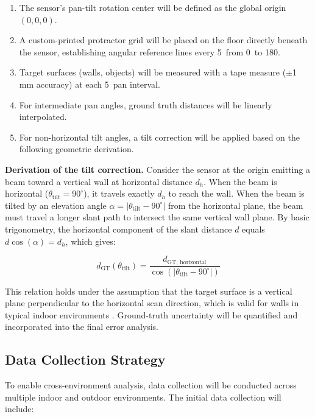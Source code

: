 \documentclass[12pt,a4paper]{article}
\begin{document}
    \begin{enumerate}[leftmargin=0.35in]
        \item The sensor's pan-tilt rotation center will be defined as the global origin $(0, 0, 0)$.
        \item A custom-printed protractor grid will be placed on the floor directly beneath the sensor, establishing angular reference lines every 5\textdegree~from 0\textdegree~to 180\textdegree.
        \item Target surfaces (walls, objects) will be measured with a tape measure ($\pm$1\,mm accuracy) at each 5\textdegree~pan interval.
        \item For intermediate pan angles, ground truth distances will be linearly interpolated.
        \item For non-horizontal tilt angles, a tilt correction will be applied based on the following geometric derivation.
    \end{enumerate}

    \textbf{Derivation of the tilt correction.} Consider the sensor at the origin emitting a beam toward a vertical wall at horizontal distance $d_h$. When the beam is horizontal ($\theta_{\text{tilt}} = 90^\circ$), it travels exactly $d_h$ to reach the wall. When the beam is tilted by an elevation angle $\alpha = |\theta_{\text{tilt}} - 90^\circ|$ from the horizontal plane, the beam must travel a longer slant path to intersect the same vertical wall plane. By basic trigonometry, the horizontal component of the slant distance $d$ equals $d \cos(\alpha) = d_h$, which gives:

    \begin{equation}
        d_{\text{GT}}(\theta_{\text{tilt}}) = \frac{d_{\text{GT, horizontal}}}{\cos(|\theta_{\text{tilt}} - 90^\circ|)}
        \label{eq:tilt_correction}
    \end{equation}

    This relation holds under the assumption that the target surface is a vertical plane perpendicular to the horizontal scan direction, which is valid for walls in typical indoor environments \cite{jimenez20143d, kim2015design}. Ground-truth uncertainty will be quantified and incorporated into the final error analysis.


    \subsection{Data Collection Strategy}

    To enable cross-environment analysis, data collection will be conducted across multiple indoor and outdoor environments. The initial data collection will include:
\end{document}

